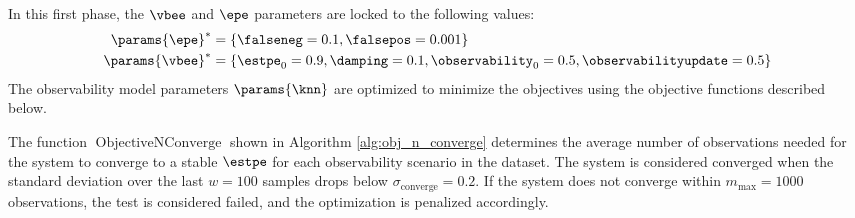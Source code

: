 In this first phase, the $\vbee$ and $\epe$ parameters are locked to the following values:
\begin{align*}
    \params{\epe}^* &= \{\falseneg = 0.1, \falsepos = 0.001\}\\
    \params{\vbee}^* &= \{\estpe_0 = 0.9, \damping = 0.1, \observability_0 = 0.5, \observabilityupdate = 0.5\}
\end{align*}
The observability model parameters $\params{\knn}$ are optimized to minimize the objectives using the objective functions described below.

The function $\operatorname{ObjectiveNConverge}$ shown in Algorithm \ref{alg:obj_n_converge} determines the average number of observations needed for the system to converge to a stable $\estpe$ for each observability scenario in the dataset. The system is considered converged when the standard deviation over the last $w = 100$ samples drops below $\sigma_{\text{converge}} = 0.2$. If the system does not converge within $m_{\text{max}} = 1000$ observations, the test is considered failed, and the optimization is penalized accordingly.

\begin{singlespace}
    \begin{algorithm}[H]
        \caption[Objective Function: $n_{converge}$]{ObjectiveNConverge}
        \label{alg:obj_n_converge}
        \begin{algorithmic}[1]
                 
                        \EndIf
                    \EndIf
                \EndFor
                \Else
                \EndIf
            \EndFor
            \EndFunction
        \end{algorithmic}
    \end{algorithm}
\end{singlespace}

